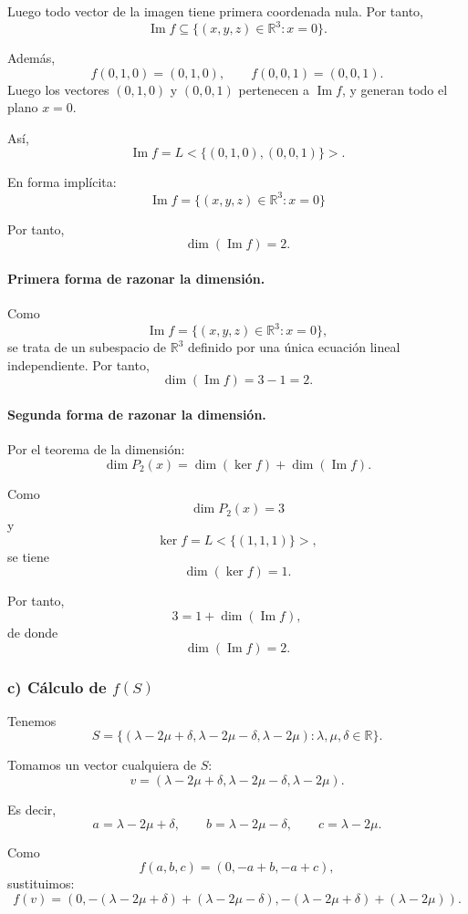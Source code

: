 \documentclass[12pt]{article}
\begin{document}
Luego todo vector de la imagen tiene primera coordenada nula. Por tanto,
\[
\operatorname{Im} f\subseteq \{(x,y,z)\in\mathbb{R}^3:x=0\}.
\]

Además,
\[
f(0,1,0)=(0,1,0),
\qquad
f(0,0,1)=(0,0,1).
\]
Luego los vectores \((0,1,0)\) y \((0,0,1)\) pertenecen a \(\operatorname{Im} f\), y generan todo el plano \(x=0\).

Así,
\[
\operatorname{Im} f=L<\{(0,1,0),(0,0,1)\}>.
\]

En forma implícita:
\[
\boxed{
\operatorname{Im} f=\{(x,y,z)\in\mathbb{R}^3:x=0\}
}
\]

Por tanto,
\[
\boxed{\dim(\operatorname{Im} f)=2.}
\]

\paragraph{Primera forma de razonar la dimensión.}

Como
\[
\operatorname{Im} f=\{(x,y,z)\in\mathbb{R}^3:x=0\},
\]
se trata de un subespacio de \(\mathbb{R}^3\) definido por una única ecuación lineal independiente. Por tanto,
\[
\dim(\operatorname{Im} f)=3-1=2.
\]

\paragraph{Segunda forma de razonar la dimensión.}

Por el teorema de la dimensión:
\[
\dim P_2(x)=\dim(\ker f)+\dim(\operatorname{Im} f).
\]

Como
\[
\dim P_2(x)=3
\]
y
\[
\ker f=L<\{(1,1,1)\}>,
\]
se tiene
\[
\dim(\ker f)=1.
\]

Por tanto,
\[
3=1+\dim(\operatorname{Im} f),
\]
de donde
\[
\dim(\operatorname{Im} f)=2.
\]

\subsubsection*{c) Cálculo de \(f(S)\)}

Tenemos
\[
S=\{(\lambda-2\mu+\delta,\lambda-2\mu-\delta,\lambda-2\mu): \lambda,\mu,\delta\in\mathbb{R}\}.
\]

Tomamos un vector cualquiera de \(S\):
\[
v=(\lambda-2\mu+\delta,\lambda-2\mu-\delta,\lambda-2\mu).
\]

Es decir,
\[
a=\lambda-2\mu+\delta,
\qquad
b=\lambda-2\mu-\delta,
\qquad
c=\lambda-2\mu.
\]

Como
\[
f(a,b,c)=(0,-a+b,-a+c),
\]
sustituimos:
\[
f(v)=
\left(
0,
-(\lambda-2\mu+\delta)+(\lambda-2\mu-\delta),
-(\lambda-2\mu+\delta)+(\lambda-2\mu)
\right).
\]
\end{document}
